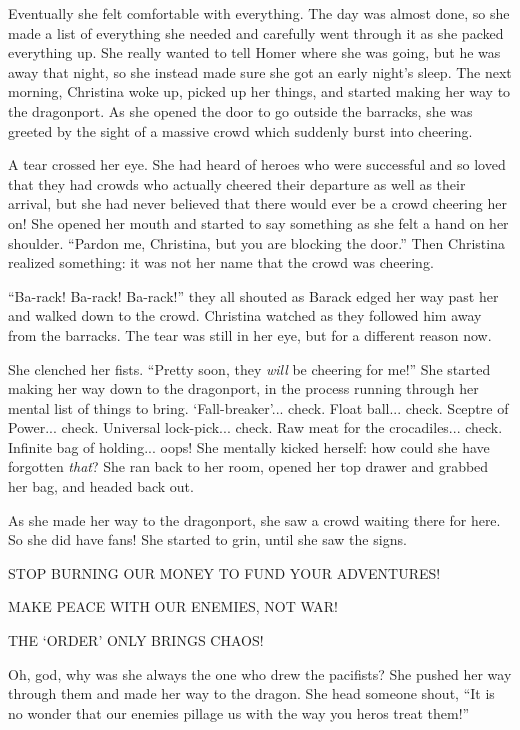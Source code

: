 \documentclass[showtrims,b6paper,draft,10pt]{memoir}
\begin{document}
Eventually she felt comfortable with everything.  The day was almost done, so she made a list of everything she needed and carefully went through it as she packed everything up.  She really wanted to tell Homer where she was going, but he was away that night, so she instead made sure she got an early night's sleep.
The next morning, Christina woke up, picked up her things, and started making her way to the dragonport.  As she opened the door to go outside the barracks, she was greeted by the sight of a massive crowd which suddenly burst into cheering.

A tear crossed her eye.  She had heard of heroes who were successful and so loved that they had crowds who actually cheered their departure as well as their arrival, but she had never believed that there would ever be a crowd cheering her on!  She opened her mouth and started to say something as she felt a hand on her shoulder.  ``Pardon me, Christina, but you are blocking the door.''  Then Christina realized something: it was not her name that the crowd was cheering.

``Ba-rack!  Ba-rack! Ba-rack!'' they all shouted as Barack edged her way past her and walked down to the crowd.  Christina watched as they followed him away from the barracks.  The tear was still in her eye, but for a different reason now.

She clenched her fists.  ``Pretty soon, they \emph{will} be cheering for me!''  She started making her way down to the dragonport, in the process running through her mental list of things to bring.  `Fall-breaker'... check.  Float ball... check.  Sceptre of Power... check.  Universal lock-pick... check.  Raw meat for the crocadiles... check.  Infinite bag of holding... oops!  She mentally kicked herself:  how could she have forgotten \emph{that}?  She ran back to her room, opened her top drawer and grabbed her bag, and headed back out.

As she made her way to the dragonport, she saw a crowd waiting there for here.  So she did have fans!  She started to grin, until she saw the signs.

STOP BURNING OUR MONEY TO FUND YOUR ADVENTURES!

MAKE PEACE WITH OUR ENEMIES, NOT WAR!

THE `ORDER' ONLY BRINGS CHAOS!

Oh, god, why was she always the one who drew the pacifists?  She pushed her way through them and made her way to the dragon.  She head someone shout,  ``It is no wonder that our enemies pillage us with the way you heros treat them!''
\end{document}
